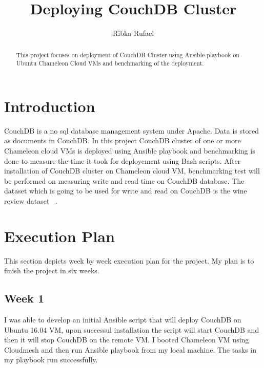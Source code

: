 \title{Deploying CouchDB Cluster}


\author{Ribka Rufael}
\orcid{}



\renewcommand{\shortauthors}{R. Rufael}


\begin{abstract}
  This project focuses on deployment of CouchDB Cluster using Ansible
  playbook on Ubuntu Chameleon Cloud VMs and benchmarking of the
  deployment.
\end{abstract}



\maketitle

\section{Introduction}

CouchDB \cite{www-Couchdb} is a no sql database management system
under Apache. Data is stored as documents in CouchDB. In this project
CouchDB cluster of one or more Chameleon cloud VMs is deployed using
Ansible playbook and benchmarking is done to measure the time it took
for deployement using Bash scripts. After installation of CouchDB
cluster on Chameleon cloud VM, benchmarking test will be performed on
measuring write and read time on CouchDB database. The dataset which
is going to be used for write and read on CouchDB is the wine review
dataset ~\cite{www-WineReview}.

\section{Execution Plan}

This section depicts week by week execution plan for the project. My
plan is to finish the project in six weeks.

\subsection{Week 1}

I was able to develop an initial Ansible script that will deploy
CouchDB on Ubuntu 16.04 VM, upon successul installation the script
will start CouchDB and then it will stop CouchDB on the remote VM. I
booted Chameleon VM using Cloudmesh and then run Ansible playbook from
my local machine. The tasks in my playbook run successfully.

